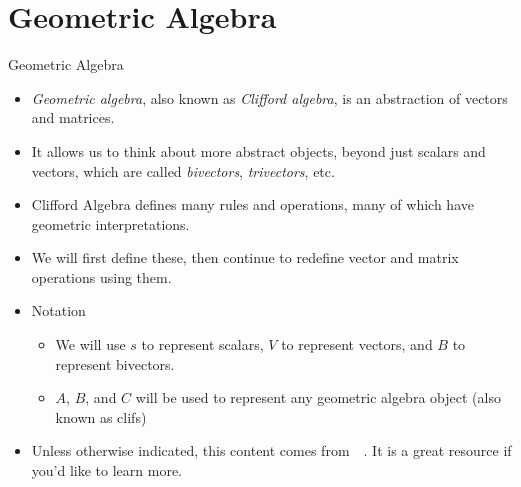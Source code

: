 \documentclass[aspectratio=169,xcolor=dvipsnames]{beamer}
\begin{document}


\section{Geometric Algebra}



\begin{frame}{Geometric Algebra}
\begin{itemize}
      \item \textit{Geometric algebra}, also known as \textit{Clifford algebra},
            is an abstraction of vectors and matrices.
      \item It allows us to think about more abstract objects, beyond just
            scalars and vectors, which are called \textit{bivectors}, 
            \textit{trivectors}, etc.
      \item Clifford Algebra defines many rules and operations, many of which have
            geometric interpretations.
      \item We will first define these, then continue to redefine vector and matrix
            operations using them.
      \item Notation
            \begin{itemize}
                  \item We will use $s$ to represent scalars, $V$ to represent vectors,
                        and $B$ to represent bivectors.
                  \item $A$, $B$, and $C$ will be used to represent any geometric algebra 
                        object (also known as clifs)
            \end{itemize}
      \item Unless otherwise indicated, this content comes from~{\color{red}~\cite{henle2025clifford}}.
            It is a great resource if you'd like to learn more.
\end{itemize}

\end{frame}
\end{document}
